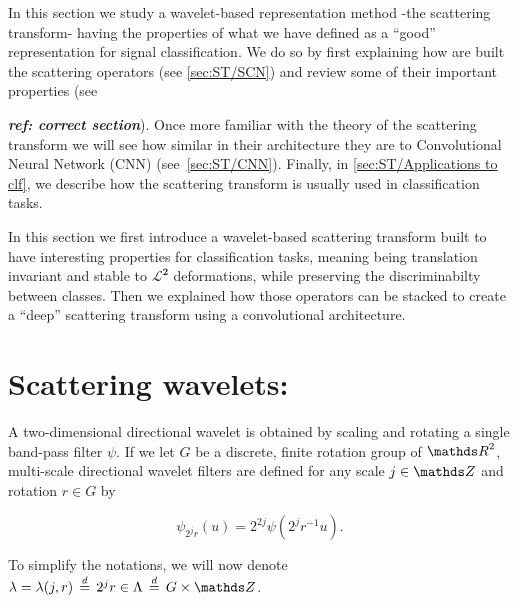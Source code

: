 \documentclass[a4paper,11pt]{report}
\begin{document}
	In this section we study a wavelet-based representation method -the scattering transform- having the properties of what we have defined as a ``good'' representation for signal classification. We do so by first explaining how are built the scattering operators (see \ref{sec:ST/SCN}) and review some of their important properties (see {\textbf{\textit{ref: correct section}}). Once more familiar with the theory of the scattering transform we will see how similar in their architecture they are to Convolutional Neural Network (CNN) (see~\ref{sec:ST/CNN}). Finally, in \ref{sec:ST/Applications to clf}, we describe how the scattering transform is usually used in classification tasks.
	
	    
    In this section we first introduce a wavelet-based scattering transform built to have interesting properties for classification tasks, meaning being translation invariant and stable to $\mathbf{\mathcal{L}^{2}}$ deformations, while preserving the discriminabilty between classes. Then we explained how those operators can be stacked to create a ``deep'' scattering transform using a convolutional architecture.
      
		\section{Scattering wavelets:}
			\label{sec:ST/Scattering wavelets}

			A two-dimensional directional wavelet is obtained by scaling and rotating a single band-pass filter $\psi$. If we let $G$ be a discrete, finite rotation group of $\dsR^{2}$, multi-scale directional wavelet filters are defined for any scale $j \in \dsZ$ and rotation $r \in G$ by
      
      \begin{equation}
				\label{eq:multi-scale directional wavelet}
				\psi_{2^{j}r}(u) = 2^{2j} \psi(2^{j}r^{-1}u).
      \end{equation}
      
      To simplify the notations, we will now denote $\lambda = \lambda(j,r) \; \eqdef \; 2^{j}r \in \Lambda \; \eqdef \; G \times \dsZ$.\\
      
}
\end{document}
